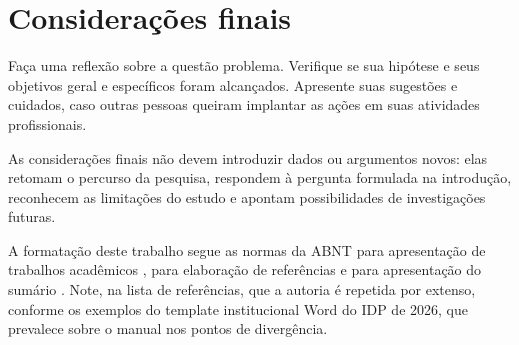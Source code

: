
\section{Considerações finais}

Faça uma reflexão sobre a questão problema. Verifique se sua hipótese e seus
objetivos geral e específicos foram alcançados. Apresente suas sugestões e
cuidados, caso outras pessoas queiram implantar as ações em suas atividades
profissionais.

As considerações finais não devem introduzir dados ou argumentos novos: elas
retomam o percurso da pesquisa, respondem à pergunta formulada na introdução,
reconhecem as limitações do estudo e apontam possibilidades de investigações
futuras.

A formatação deste trabalho segue as normas da ABNT para apresentação de
trabalhos acadêmicos \parencite{abnt14724}, para elaboração de referências
\parencite{abnt6023} e para apresentação do sumário \parencite{abnt6027}. Note,
na lista de referências, que a autoria é repetida por extenso, conforme os
exemplos do template institucional Word do IDP de 2026, que prevalece sobre
o manual nos pontos de divergência.
